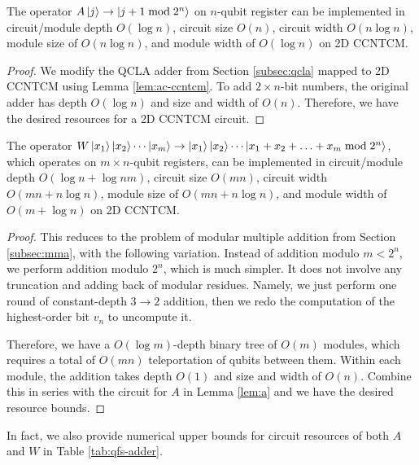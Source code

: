 \begin{lemma}
The operator $A\left\vert{j}\right\rangle \rightarrow \left\vert{j+1 \bmod 2^n}\right\rangle$ on
$n$-qubit register can be
implemented in circuit/module depth $O(\log n)$, circuit size $O(n)$, 
circuit width $O(n\log n)$, module size of $O(n \log n)$, and
module width of $O(\log n)$ on
\textsf{2D CCNTCM}.
\label{lem:a}
\end{lemma}

\begin{proof}
We modify the QCLA adder from
Section \ref{subsec:qcla} mapped to \textsf{2D CCNTCM} using
Lemma \ref{lem:ac-ccntcm}.
To add $2 \times n$-bit numbers, the original  adder has
depth $O(\log n)$ and size and width of $O(n)$.
Therefore, we have the desired resources for a \textsf{2D CCNTCM} circuit.
\end{proof}

\begin{lemma}
The operator $W\left\vert{x_1}\right\rangle\left\vert{x_2}\right\rangle\cdots\left\vert{x_m}\right\rangle \rightarrow \left\vert{x_1}\right\rangle\left\vert{x_2}\right\rangle\cdots\left\vert{x_1 + x_2 + \ldots + x_m \bmod 2^n}\right\rangle$,
which operates on $m \times n$-qubit registers, can be
implemented in circuit/module depth $O(\log n + \log nm)$, circuit size $O(mn)$, 
circuit width $O(mn + n\log n)$, module size of $O(mn + n \log n)$, and
module width of $O(m + \log n)$ on
\textsf{2D CCNTCM}.
\label{lem:w}
\end{lemma}

\begin{proof}
This reduces to the problem of modular multiple addition from
Section \ref{subsec:mma}, with the following variation. Instead of
addition modulo $m < 2^n$, we perform addition modulo $2^n$, which is
much simpler. It does not involve any truncation and adding back of
modular residues. Namely, we just perform one round of constant-depth
$3 \rightarrow 2$ addition, then we redo the computation of the
highest-order bit $v_n$ to uncompute it.

Therefore, we have a $O(\log m)$-depth binary tree of $O(m)$ modules,
which requires a total of $O(mn)$ teleportation of qubits between them.
Within each module, the addition takes depth $O(1)$ and size and width
of $O(n)$. Combine this in series with the circuit for $A$ in
Lemma \ref{lem:a} and we have the desired resource bounds.
\end{proof}

In fact, we also provide numerical upper bounds for circuit resources
of both $A$ and $W$ in Table \ref{tab:qfs-adder}.

